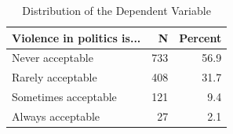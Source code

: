 \begin{table}[!h]
\centering
\caption{Distribution of the Dependent Variable}
\centering
\begin{tabular}[t]{lrr}
\toprule
Violence in politics is... & N & Percent\\
\midrule
Never acceptable & 733 & 56.9\\
Rarely acceptable & 408 & 31.7\\
Sometimes acceptable & 121 & 9.4\\
Always acceptable & 27 & 2.1\\
\bottomrule
\end{tabular}
\end{table}

